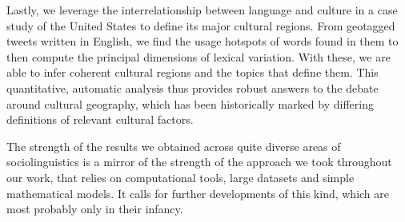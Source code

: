 \documentclass[../thesis.tex]{subfiles}
\begin{document}
Lastly, we leverage the interrelationship between language and culture in a case study
of the United States to define its major cultural regions. From geotagged tweets written
in English, we find the usage hotspots of words found in them to then compute the
principal dimensions of lexical variation. With these, we are able to infer coherent
cultural regions and the topics that define them. This quantitative, automatic analysis
thus provides robust answers to the debate around cultural geography, which has been
historically marked by differing definitions of relevant cultural factors.

The strength of the results we obtained across quite diverse areas of sociolinguistics
is a mirror of the strength of the approach we took throughout our work, that relies on
computational tools, large datasets and simple mathematical models. It calls for further
developments of this kind, which are most probably only in their infancy. 

\clearpage
\end{document}
